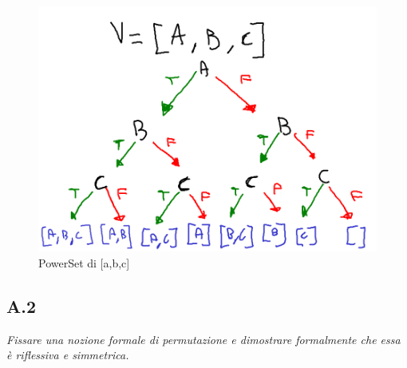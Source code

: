 \documentclass[a4paper]{article}
\begin{document}
\begin{figure}[!ht]
\centering
\includegraphics[scale = 0.5]{./img/A1_2.png}
\caption{PowerSet di [a,b,c]} \label{FIG:PowerSet}
\end{figure}
\subsection{A.2}
\emph{Fissare una nozione formale di permutazione e dimostrare formalmente che essa è riflessiva e simmetrica.}
\end{document}
